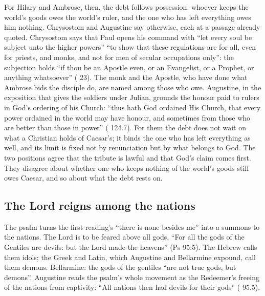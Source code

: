 For Hilary and Ambrose, then, the debt follows possession: whoever keeps the
world's goods owes the world's ruler, and the one who has left everything owes
him nothing. Chrysostom and Augustine say otherwise, each at a passage already
quoted. Chrysostom says that Paul opens his command with ``let every soul be
subject unto the higher powers'' ``to show that these regulations are for all,
even for priests, and monks, and not for men of secular occupations only'':
the subjection holds ``if thou be an Apostle even, or an Evangelist, or a
Prophet, or anything whatsoever'' ( 23). The monk
and the Apostle, who have done what Ambrose bids the disciple do, are named
among those who owe. Augustine, in the exposition that gives the
soldiers under Julian, grounds the honour paid to rulers in God's ordering of
his Church: ``thus hath God ordained His Church, that every power ordained in
the world may have honour, and sometimes from those who are better than those
in power'' ( 124.7). For them the debt does not
wait on what a Christian holds of Caesar's; it binds the one who has left
everything as well, and its limit is fixed not by renunciation but by what
belongs to God. The two positions agree that the tribute is lawful and that
God's claim comes first. They disagree about whether one who keeps nothing of
the world's goods still owes Caesar, and so about what the debt rests on.

\subsection{The Lord reigns among the nations}

The psalm turns the first reading's ``there is none besides me'' into a summons
to the nations. The Lord is to be feared above all gods, ``For all the gods of
the Gentiles are devils: but the Lord made the heavens'' (Ps 95:5). The Hebrew
calls them idols; the Greek and Latin, which Augustine and Bellarmine expound,
call them demons. Bellarmine: the gods of the gentiles ``are not true gods, but
demons''. Augustine reads the psalm's whole movement as the Redeemer's freeing
of the nations from captivity: ``All nations then had devils for their gods''
( 95.5).

